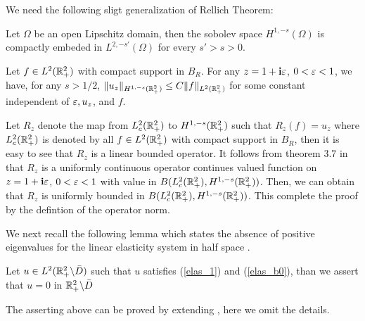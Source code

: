 \documentclass[12pt]{iopart}
\begin{document}
We need the following sligt generalization of Rellich Theorem:
\begin{lem}\label{relli_embed}
	Let $\Omega$ be an open Lipschitz domain, then the sobolev space $H^{1,-s}(\Omega)$ is compactly embeded in $L^{2,-s'}(\Omega)$ for every $s'>s>0$.
\end{lem}

\begin{lem}{\label{global_es}}
	Let  $ f  \in L^2 ({\mathbb{R}}^2_+) $ with compact support in $B_R$. For any $z=1+\mathbf{i}\varepsilon$, $0<\varepsilon<1$, we have, for any $s>1/2$,
	$\|u_z\|_{H^{1,-s}({\mathbb{R}}^2_+)}\le C\|f\|_{L^2({\mathbb{R}}^2_+)}$ for some constant independent of $\varepsilon, u_z$, and $f$.
\end{lem}
\debproof
Let $R_z$ denote the map from $L^2_c({\mathbb{R}}^2_+)$ to $H^{1,-s}({\mathbb{R}}^2_+)$ such that $R_z(f)=u_z$ where $L^2_c({\mathbb{R}}^2_+)$ is denoted by all $ f  \in L^2 ({\mathbb{R}}^2_+) $ with compact support in $B_R$, then it is easy to see that $R_z$ is a linear bounded operator. It follows from theorem 3.7 in \cite{Yves1988} that $R_z$ is a uniformly continuous operator continues valued function on $z=1+\mathbf{i}\varepsilon$, $0<\varepsilon<1$ with value in $B(L^2_c({\mathbb{R}}^2_+),H^{1,-s}({\mathbb{R}}^2_+))$. Then, we can obtain that $R_z$ is uniformly bounded in $B(L^2_c({\mathbb{R}}^2_+),H^{1,-s}({\mathbb{R}}^2_+))$. This complete the proof by the defintion of the operator norm.
\finproof

We next recall the following lemma which states the absence of positive eigenvalues for the linear elasticity system in half space \cite{sini2004}.
\begin{lem} \label{elas_unique}
	Let $u\in L^2({\mathbb{R}}^2_+ \backslash \bar D)$ such that $u$ satisfies (\ref{elas_1}) and (\ref{elas_b0}), than we assert that $u=0$ in ${\mathbb{R}}^2_+ \backslash \bar D$
\end{lem}
\debproof
The asserting above can be proved by extending \cite[theorem 3.1]{sini2004}, here we omit the details.
\finproof
\end{document}
